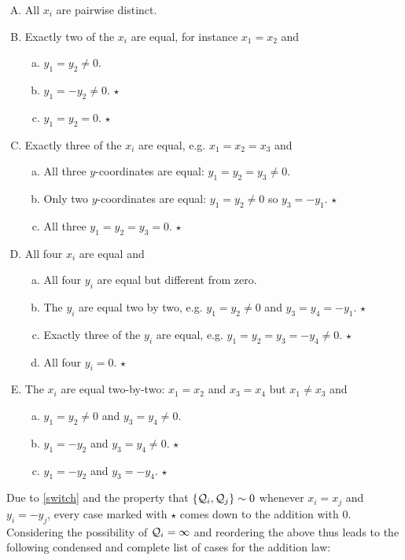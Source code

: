 \documentclass[english,11pt,a4paper]{article}
\begin{document}
\begin{enumerate}[A.]
	\parskip 1mm
	\item All $x_i$ are pairwise distinct.
	\item Exactly two of the $x_i$ are equal, for instance $x_1=x_2$ and
	\begin{enumerate}[a.]
		\item $y_1 = y_2 \neq 0$.
		\item $y_1 = -y_2 \neq 0$. \hfill $\star$
		\item $y_1=y_2=0$. \hfill $\star$
	\end{enumerate}
	\item Exactly three of the $x_i$ are equal, e.g. $x_1=x_2=x_3$ and
	\begin{enumerate}[a.]
		\item All three $y$-coordinates are equal: $y_1 = y_2 = y_3 \neq 0$.
		\item Only two $y$-coordinates are equal: $y_1 = y_2 \neq 0$ so $y_3=-y_1$. \hfill $\star$
		\item All three $y_1=y_2=y_3=0$. \hfill $\star$
	\end{enumerate}
	\item All four $x_i$ are equal and
	\begin{enumerate}[a.]
		\item All four $y_i$ are equal but different from zero.
		\item The $y_i$ are equal two by two, e.g. $y_1=y_2 \neq 0$ and $y_3=y_4 = -y_1$. \hfill $\star$
		\item Exactly three of the $y_i$ are equal, e.g. $y_1=y_2=y_3=-y_4 \neq 0$. \hfill $\star$
		\item All four $y_i=0$. \hfill $\star$
	\end{enumerate}
	\item The $x_i$ are equal two-by-two: $x_1=x_2$ and $x_3=x_4$ but $x_1 \neq x_3$ and
	\begin{enumerate}[a.]
		\item $y_1 = y_2 \neq 0$ and $y_3=y_4 \neq 0$.
		\item $y_1 = -y_2$ and $y_3=y_4 \neq 0$. \hfill $\star$
		\item $y_1 = -y_2$ and $y_3=-y_4$. \hfill $\star$
	\end{enumerate}
\end{enumerate}

Due to \eqref{switch} and the property that $\{ \mathcal{Q}_i, \mathcal{Q}_j \} \sim 0$ whenever $x_i=x_j$ and $y_i = -y_j$, every case marked with $\star$ comes down to the addition with 0. Considering the possibility of $\mathcal{Q}_i = \infty$ and reordering the above thus leads to the following condensed and complete list of cases for the addition law:
\end{document}
